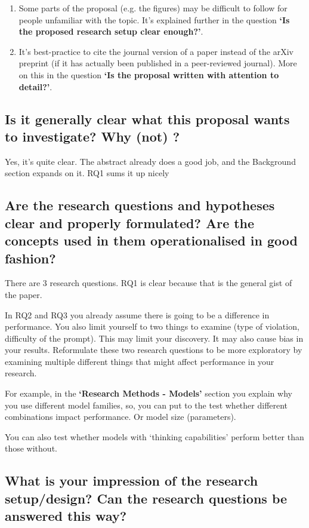 \documentclass{article}
\begin{document}
\begin{enumerate}
	\item Some parts of the proposal (e.g. the figures) may be difficult to follow for people unfamiliar with the topic. It's explained further in the question \textbf{`Is the proposed research setup clear enough?'}.
	\item It's best-practice to cite the journal version of a paper instead of the arXiv preprint (if it has actually been published in a peer-reviewed journal). More on this in the question \textbf{`Is the proposal written with attention to detail?'}.
\end{enumerate}





\subsection{Is it generally clear what this proposal wants to investigate? Why (not) ?}

Yes, it's quite clear. The abstract already does a good job, and the Background section expands on it. RQ1 sums it up nicely

\subsection{Are the research questions and hypotheses clear and properly formulated? Are the concepts used in them operationalised in good fashion?}

There are 3 research questions. RQ1 is clear because that is the general gist of the paper.

In RQ2 and RQ3 you already assume there is going to be a difference in performance. You also limit yourself to two things to examine (type of violation, difficulty of the prompt). This may limit your discovery. It may also cause bias in your results. Reformulate these two research questions to be more exploratory by examining multiple different things that might affect performance in your research.

For example, in the \textbf{`Research Methods - Models'} section you explain why you use different model families, so, you can put to the test whether different combinations impact performance. Or model size (parameters).

You can also test whether models with `thinking capabilities' perform better than those without.

\subsection{What is your impression of the research setup/design? Can the research questions be answered this way?}
\end{document}
